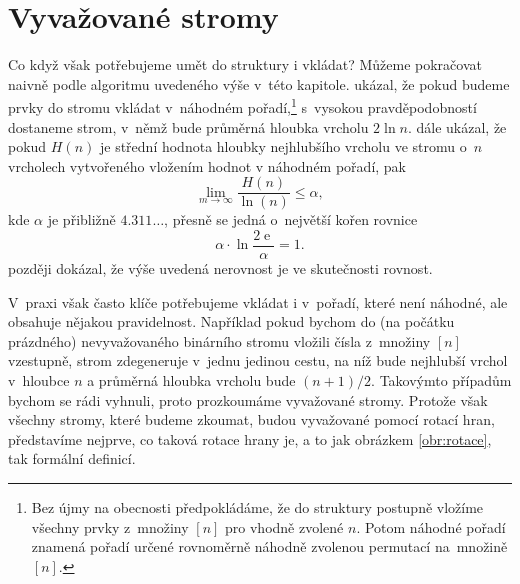 \section{Vyvažované stromy}

Co když však potřebujeme umět do struktury i vkládat? Můžeme pokračovat naivně
podle algoritmu uvedeného výše v~této kapitole. \citet{sortingsearching}
ukázal, že pokud budeme prvky do stromu vkládat v~náhodném pořadí,\footnote{Bez
újmy na obecnosti předpokládáme, že do struktury postupně vložíme všechny prvky
z~množiny $[n]$ pro vhodně zvolené $n$. Potom náhodné pořadí znamená pořadí
určené rovnoměrně náhodně zvolenou permutací na~množině $[n]$.} s~vysokou
pravděpodobností dostaneme strom, v~němž bude průměrná hloubka vrcholu $2 \ln n$.
\citet{Robson} dále ukázal, že pokud $H(n)$ je střední hodnota hloubky nejhlubšího 
vrcholu ve stromu o~$n$ vrcholech vytvořeného vložením hodnot v náhodném pořadí, pak $$\lim_{m\rightarrow
\infty}\frac{H(n)}{\ln(n)}\leq\alpha,$$ kde $\alpha$ je přibližně
$4.311\dots$, přesně se jedná o~největší kořen rovnice $$\alpha\cdot \ln
\frac{2\operatorname{e}}{\alpha} = 1.$$ \citet{devroye} později dokázal, že výše uvedená
nerovnost je ve skutečnosti rovnost.

V~praxi však často klíče potřebujeme vkládat i v~pořadí, které není náhodné,
ale obsahuje nějakou pravidelnost. Například pokud bychom do (na počátku prázdného)
nevyvažovaného binárního stromu vložili čísla z~množiny $[n]$ vzestupně, strom
zdegeneruje v~jednu jedinou cestu, na níž bude nejhlubší vrchol v~hloubce $n$ a
průměrná hloubka vrcholu bude $(n+1)/2$. Takovýmto případům bychom se rádi
vyhnuli, proto prozkoumáme vyvažované stromy. Protože však všechny stromy,
které budeme zkoumat, budou vyvažované pomocí rotací hran, představíme nejprve,
co taková rotace hrany je, a to jak obrázkem \ref{obr:rotace}, tak formální definicí.


